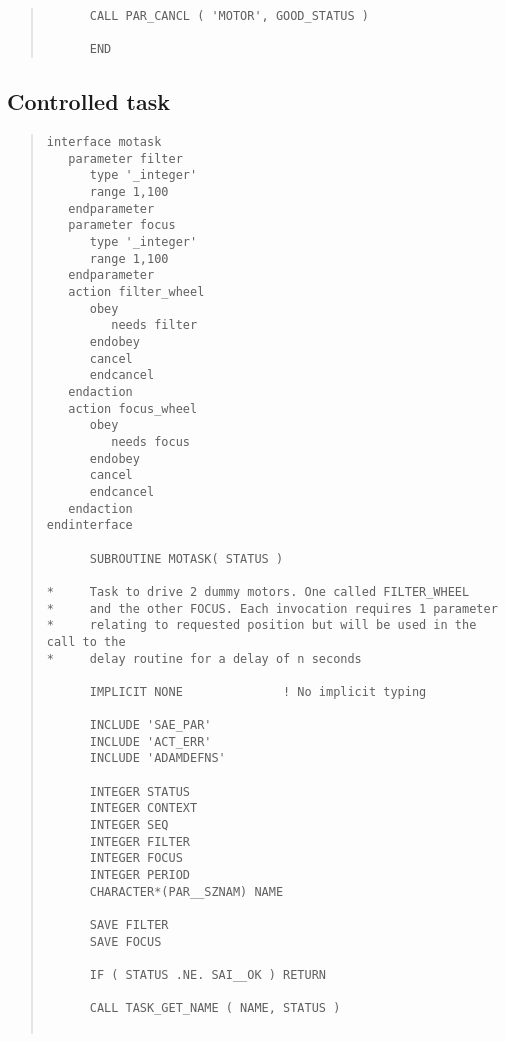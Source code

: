 \documentclass[twoside,11pt]{article}
\renewcommand{\_}{\texttt{\symbol{95}}}
\begin{document}
\begin{quote}
\begin{verbatim}
      CALL PAR_CANCL ( 'MOTOR', GOOD_STATUS )

      END

\end{verbatim} \end{quote} \normalsize

\subsection{Controlled task}

\small \begin{quote} \begin{verbatim}
interface motask
   parameter filter
      type '_integer'
      range 1,100
   endparameter
   parameter focus
      type '_integer'
      range 1,100
   endparameter
   action filter_wheel
      obey
         needs filter
      endobey
      cancel
      endcancel
   endaction
   action focus_wheel
      obey
         needs focus
      endobey
      cancel
      endcancel
   endaction
endinterface

      SUBROUTINE MOTASK( STATUS )

*     Task to drive 2 dummy motors. One called FILTER_WHEEL
*     and the other FOCUS. Each invocation requires 1 parameter
*     relating to requested position but will be used in the call to the
*     delay routine for a delay of n seconds

      IMPLICIT NONE              ! No implicit typing

      INCLUDE 'SAE_PAR'
      INCLUDE 'ACT_ERR'
      INCLUDE 'ADAMDEFNS'

      INTEGER STATUS
      INTEGER CONTEXT
      INTEGER SEQ
      INTEGER FILTER
      INTEGER FOCUS
      INTEGER PERIOD
      CHARACTER*(PAR__SZNAM) NAME

      SAVE FILTER
      SAVE FOCUS

      IF ( STATUS .NE. SAI__OK ) RETURN

      CALL TASK_GET_NAME ( NAME, STATUS )


\end{verbatim}
\end{quote}
\end{document}

